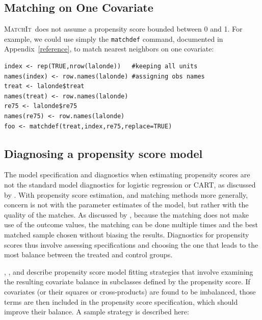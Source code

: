 \documentclass[oneside,letterpaper,titlepage]{article}
\newcommand{\MatchIt}{\textsc{MatchIt}}
\begin{document}
\subsection{Matching on One Covariate}
\MatchIt\ does not assume a propensity score bounded between 0 and 1.
For example, we could use simply the \texttt{matchdef} command,
documented in Appendix~\ref{reference}, to match nearest neighbors on
one covariate:

\begin{verbatim}
index <- rep(TRUE,nrow(lalonde))   #keeping all units
names(index) <- row.names(lalonde) #assigning obs names
treat <- lalonde$treat
names(treat) <- row.names(lalonde)
re75 <- lalonde$re75
names(re75) <- row.names(lalonde)
foo <- matchdef(treat,index,re75,replace=TRUE)
\end{verbatim}

\subsection{Diagnosing a propensity score model}
The model specification and diagnostics when estimating propensity scores are not the standard model diagnostics
for logistic regression or CART, as
discussed by \cite{Rubin04}.  With propensity score estimation, and matching methods more generally, concern is not with the parameter estimates
of the model, but rather with the quality of the matches.  As discussed by \cite{Greevy04}, because the matching does not make use of
the outcome values, the matching can 
be done multiple times and the 
best matched sample chosen without biasing the results.  Diagnostics for propensity scores thus involve assessing specifications and choosing
the one that leads to the most balance between the treated and control groups.

\cite{RosRub84a}, \cite{Perkins00}, and \cite{DehWah02} describe propensity score model fitting strategies 
that involve examining the resulting covariate balance in subclasses defined by the propensity score.  If 
covariates (or their squares or cross-products) are found to be imbalanced, those terms are then included in the propensity
score specification, which should improve their balance.  A sample strategy is described here:
\end{document}
